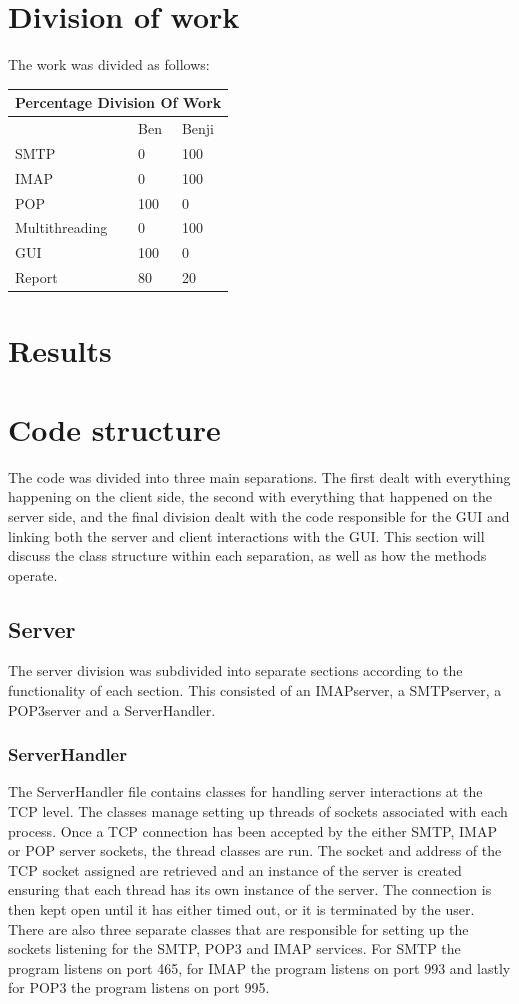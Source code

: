 \documentclass[11pt]{article}
\begin{document}
\begin{multicols}{2}
\section{Division of work}
The work was divided as follows:\\
\break{}
\begin{tabular}{ |p{3cm}||p{1.5cm}|p{1.5cm}|}
 \hline
 \multicolumn{3}{|c|}{Percentage Division Of Work} \\
 \hline
  & Ben & Benji\\
 \hline
 SMTP & 0 & 100\\
 IMAP & 0 & 100\\
 POP & 100 & 0\\
 Multithreading & 0 & 100\\
 GUI & 100 & 0\\
 Report & 80 & 20\\
 \hline
\end{tabular}

\section{Results}

\section{Code structure}
The code was divided into three main separations. The first dealt with everything happening on the client side, the second with everything that happened on the server side, and the final division dealt with the code responsible for the GUI and linking both the server and client interactions with the GUI. This section will discuss the class structure within each separation, as well as how the methods operate.

\subsection{Server}
The server division was subdivided into separate sections according to the functionality of each section. This consisted of an IMAPserver, a SMTPserver, a POP3server and a ServerHandler.
\subsubsection{ServerHandler}
The ServerHandler file contains classes for handling server interactions at the TCP level. The classes manage setting up threads of sockets associated with each process. Once a TCP connection has been accepted by the either SMTP, IMAP or POP server sockets, the thread classes are run. The socket and address of the TCP socket assigned are retrieved and an instance of the server is created ensuring that each thread has its own instance of the server. The connection is then kept open until it has either timed out, or it is terminated by the user.\\
There are also three separate classes that are responsible for setting up the sockets listening for the SMTP, POP3 and IMAP services. For SMTP the program listens on port 465, for IMAP the program listens on port 993 and lastly for POP3 the program listens on port 995.\\

\end{multicols}
\end{document}
